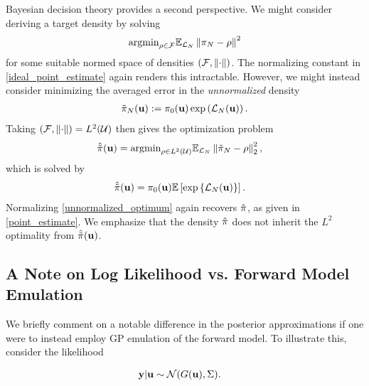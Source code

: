 \documentclass[12pt]{article}
\begin{document}
Bayesian decision theory provides a second perspective. We might consider deriving a target density by solving 
\begin{align}
\text{argmin}_{\rho \in \mathcal{F}} \mathbb{E}_{\mathcal{L}_{N}} \left\lVert\pi_{N} - \rho\right\rVert^2
\end{align}  
for some suitable normed space of densities $(\mathcal{F}, \left\lVert\cdot\right\rVert)$. The normalizing constant in \ref{ideal_point_estimate} again renders 
this intractable. However, we might instead consider minimizing the averaged error in the \textit{unnormalized} density 
\begin{align}
\tilde{\pi}_{N}(\mathbf{u}) := \pi_0(\mathbf{u}) \exp\left(\mathcal{L}_{N}(\mathbf{u})\right). 
\end{align}
Taking $(\mathcal{F}, \left\lVert\cdot\right\rVert) = L^2(\mathcal{U})$ then gives the optimization problem 
\begin{align}
\hat{\tilde{\pi}}(\mathbf{u}) &= \text{argmin}_{\rho \in L^2(\mathcal{U})} \mathbb{E}_{\mathcal{L}_{N}} \left\lVert\tilde{\pi}_{N} - \rho\right\rVert_2^2,
\end{align} 
which is solved by 
\begin{align}
\hat{\tilde{\pi}}(\mathbf{u}) &= \pi_0(\mathbf{u}) \mathbb{E}\left[\exp\left\{\mathcal{L}_{N}(\mathbf{u})\right\} \right]. \label{unnormalized_optimum}
\end{align}
Normalizing \ref{unnormalized_optimum} again recovers $\hat{\pi}$, as given in \ref{point_estimate}. We emphasize that the density 
$\hat{\pi}$ does not inherit the $L^2$ optimality from $\hat{\tilde{\pi}}(\mathbf{u})$. 

\subsection{A Note on Log Likelihood vs. Forward Model Emulation}
We briefly comment on a notable difference in the posterior approximations if one were to instead employ GP emulation of the forward model. 
To illustrate this, consider the likelihood  

\begin{align*}
\mathbf{y}|\mathbf{u} &\sim \mathcal{N}(G(\mathbf{u}), \Sigma). 
\end{align*}
\end{document}
